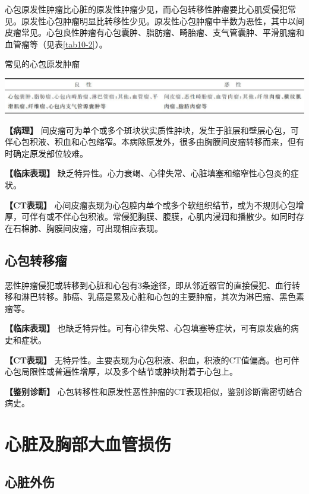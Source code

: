 心包原发性肿瘤比心脏的原发性肿瘤少见，而心包转移性肿瘤要比心肌受侵犯常见。原发性心包肿瘤明显比转移性少见。原发性心包肿瘤中半数为恶性，其中以间皮瘤常见。心包良性肿瘤有心包囊肿、脂肪瘤、畸胎瘤、支气管囊肿、平滑肌瘤和血管瘤等（见表\ref{tab10-2}）。

\begin{table}[htbp]
\centering
\caption{常见的心包原发肿瘤}
\label{tab10-2}
\includegraphics[width=\textwidth,height=\textheight,keepaspectratio]{./images/Image00269.jpg}
\end{table}

\textbf{【病理】}
间皮瘤可为单个或多个斑块状实质性肿块，发生于脏层和壁层心包，可伴心包积液、积血和心包缩窄。本病除原发外，很多由胸膜间皮瘤转移而来，但有时确定原发部位较难。

\textbf{【临床表现】}
缺乏特异性。心力衰竭、心律失常、心脏填塞和缩窄性心包炎的症状。

\textbf{【CT表现】}
心间皮瘤表现为心包腔内单个或多个软组织结节，或为不规则心包增厚，可伴有或不伴心包积液。常侵犯胸膜、腹膜，心肌内浸润和播散少。如同时存在石棉肺、胸膜间皮瘤，可出现相应表现。

\subsection{心包转移瘤}

恶性肿瘤侵犯或转移到心脏和心包有3条途径，即从邻近器官的直接侵犯、血行转移和淋巴转移。肺癌、乳癌是累及心脏和心包的主要肿瘤，其次为淋巴瘤、黑色素瘤等。

\textbf{【临床表现】}
也缺乏特异性。可有心律失常、心包填塞等症状，可有原发癌的病史和症状。

\textbf{【CT表现】}
无特异性。主要表现为心包积液、积血，积液的CT值偏高。也可伴心包局限性或普遍性增厚，以及多个结节或肿块附着于心包上。

\textbf{【鉴别诊断】}
心包转移性和原发性恶性肿瘤的CT表现相似，鉴别诊断需密切结合病史。

\section{心脏及胸部大血管损伤}

\subsection{心脏外伤}

